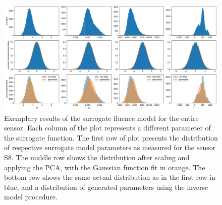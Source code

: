 \begin{figure}
\centering
\includegraphics[width=1.\textwidth]{figures/chapter4/surrogates/p3_model_pipe.png}
\caption{Exemplary results of the surrogate fluence model for the entire sensor. Each column of the plot represents a different parameter of the surrogate function. The first row of plot presents the distribution of respective surrogate model parameters as measured for the sensor S8. The middle row shows the distribution after scaling and applying the PCA, with the Gaussian function fit in orange.
  The bottom row shows the same actual distribution as in the first row in blue, and a distribution of generated parameters using the inverse model procedure.
}
\label{fig:surrogate_model_total}
\end{figure}

